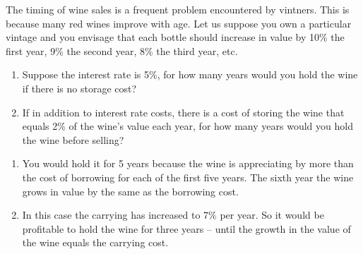 \begin{enumialphparenastyle}
\begin{ex}
\begin{sol}
\end{sol}
\end{ex}

\begin{ex}\label{ex:ch12ex8}
The timing of wine sales is a frequent problem encountered by vintners. This is because many red wines improve with age. Let us suppose you own a particular vintage and you envisage that each bottle should increase in value by 10\% the first year, 9\% the second year, 8\% the third year, etc.
\begin{enumerate}
	\item	Suppose the interest rate is 5\%, for how many years would you hold the wine if there is no storage cost?
	\item	If in addition to interest rate costs, there is a cost of storing the wine that equals 2\% of the wine's value each year, for how many years would you hold the wine before selling?
\end{enumerate}
\begin{sol}
\begin{enumerate}
	\item	You would hold it for 5 years because the wine is appreciating by more than the cost of borrowing for each of the first five years. The sixth year the wine grows in value by the same as the borrowing cost.
	\item	In this case the carrying has increased to 7\% per year. So it would be profitable to hold the wine for three years -- until the growth in the value of the wine equals the carrying cost.
\end{enumerate}
\end{sol}
\end{ex}


\end{enumialphparenastyle}
